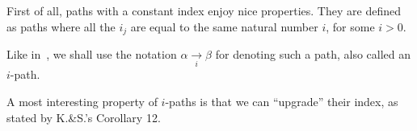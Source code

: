 First of all, paths with a constant index 
enjoy nice properties. They are defined as paths where all the $i_j$ are equal to the same natural number $i$, for some $i>0$. 


Like in~\cite{KS81}, we shall use the notation $\alpha \xrightarrow[i]{} \beta$ for denoting such a path, also called an $i$-path.














A most interesting property of $i$-paths is that we can ``upgrade'' their index, as stated by K.\&S.'s Corollary 12.

